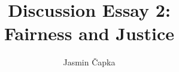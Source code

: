 \documentclass[11pt, a4paper]{article}
\begin{document}
    \title{Discussion Essay 2:\\Fairness and Justice}
    \author{Jasmin Čapka}

    \maketitle

    

    \newpage
    \printbibliography
\end{document}
